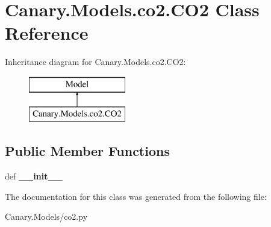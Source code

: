 \hypertarget{class_canary_8_models_1_1co2_1_1_c_o2}{\section{Canary.\-Models.\-co2.\-C\-O2 Class Reference}
\label{class_canary_8_models_1_1co2_1_1_c_o2}
}
Inheritance diagram for Canary.\-Models.\-co2.\-C\-O2\-:\begin{figure}[H]
\begin{center}
\leavevmode
\includegraphics[height=2.000000cm]{class_canary_8_models_1_1co2_1_1_c_o2}
\end{center}
\end{figure}
\subsection*{Public Member Functions}
\begin{DoxyCompactItemize}
\item 
\hypertarget{class_canary_8_models_1_1co2_1_1_c_o2_ab9fd36117089a89414da1b8fd9793f54}{def {\bfseries \-\_\-\-\_\-init\-\_\-\-\_\-}}\label{class_canary_8_models_1_1co2_1_1_c_o2_ab9fd36117089a89414da1b8fd9793f54}

\end{DoxyCompactItemize}


The documentation for this class was generated from the following file\-:\begin{DoxyCompactItemize}
\item 
Canary.\-Models/co2.\-py\end{DoxyCompactItemize}
